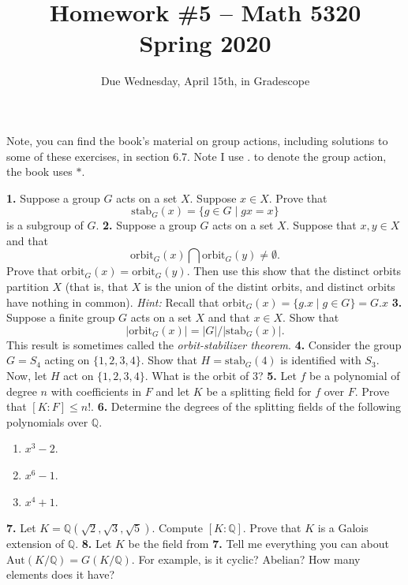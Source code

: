 \documentclass[10pt]{amsart}
\theoremstyle{theorem}
\newcommand{\bQ}{\mathbb{Q}}
\begin{document}
\title{Homework \#5 -- Math 5320\\Spring 2020}
\author{Due Wednesday, April 15th, in Gradescope}

\maketitle

Note, you can find the book's material on group actions, including solutions to some of these exercises, in section 6.7.  Note I use $.$ to denote the group action, the book uses $*$.
  
\noindent
{\bf 1.}  Suppose a group $G$ acts on a set $X$.  Suppose $x \in X$.  Prove that
\[
    \mathrm{stab}_G(x) = \{g \in G\;|\; gx = x\}
\]
is a subgroup of $G$.  
\newpage
\noindent
{\bf 2.}  Suppose a group $G$ acts on a set $X$.  Suppose that $x,y \in X$ and that 
\[
    \mathrm{orbit}_G(x) \bigcap \mathrm{orbit}_G(y) \neq \emptyset.
\]
Prove that $\mathrm{orbit}_G(x) = \mathrm{orbit}_G(y)$.  Then use this show that the distinct orbits partition $X$ (that is, that $X$ is the union of the distint orbits, and distinct orbits have nothing in common).
\vskip 3pt
\emph{Hint:}  Recall that $\mathrm{orbit}_G(x) = \{g.x \;|\; g \in G\} = G.x$
\newpage
\noindent
{\bf 3.}  Suppose a finite group $G$ acts on a set $X$ and that $x \in X$.  Show that 
\[
    |\mathrm{orbit}_G(x)| = |G| / |\mathrm{stab}_G(x)|.
\]   
This result is sometimes called the \emph{orbit-stabilizer theorem}.
\newpage
\noindent
{\bf 4.}  Consider the group $G = S_4$ acting on $\{1, 2, 3, 4\}$.  Show that $H = \mathrm{stab}_G(4)$ is identified with $S_3$.  Now, let $H$ act on $\{1,2,3,4\}$.  What is the orbit of $3$?
\newpage
\noindent
{\bf 5.}  Let $f$ be a polynomial of degree $n$ with coefficients in $F$ and let $K$ be a splitting field for $f$ over $F$.  Prove that $[K : F] \leq n!$.
\newpage
\noindent
{\bf 6.}  Determine the degrees of the splitting fields of the following polynomials over $\bQ$.
\begin{enumerate}
    \item $x^3 - 2$.
    \item $x^6 - 1$.
    \item $x^4 + 1$.
\end{enumerate}
\newpage
\noindent
{\bf 7.}  Let $K = \bQ(\sqrt{2}, \sqrt{3}, \sqrt{5})$.  Compute $[K : \bQ]$.  Prove that $K$ is a Galois extension of $\bQ$.
\newpage
\noindent
{\bf 8.}  Let $K$ be the field from {\bf 7.}  Tell me everything you can about $\mathrm{Aut}(K/\bQ) = G(K/\bQ)$.  For example, is it cyclic? Abelian?  How many elements does it have?
\end{document}
